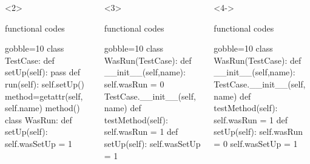 \documentclass[lualatex]{beamer}
\begin{document}
\begin{frame}[fragile,t]
\begin{columns}[t]
    \begin{onlyenv}<2>
      \begin{block}{functional codes}
        \begin{pythoncode*}{gobble=10}
          class TestCase:
            def setUp(self):
              pass
            def run(self):
              self.setUp()
              method=getattr(self, self.name)
              method()
          class WasRun:
            def setUp(self):
              self.wasSetUp = 1
        \end{pythoncode*}
      \end{block}
    \end{onlyenv}
    \begin{onlyenv}<3>
      \begin{block}{functional codes}
        \begin{pythoncode*}{gobble=10}
          class WasRun(TestCase):
            def __init__(self,name):
              self.wasRun = 0
              TestCase.__init__(self, name)
            def testMethod(self):
              self.wasRun = 1
            def setUp(self):
              self.wasSetUp = 1
        \end{pythoncode*}
      \end{block}
    \end{onlyenv}
    \begin{onlyenv}<4->
      \begin{block}{functional codes}
        \begin{pythoncode*}{gobble=10}
          class WasRun(TestCase):
            def __init__(self,name):
              TestCase.__init__(self, name)
            def testMethod(self):
              self.wasRun = 1
            def setUp(self):
              self.wasRun = 0
              self.wasSetUp = 1
        \end{pythoncode*}
      \end{block}
    \end{onlyenv}
  \end{columns}
\end{frame}
\end{document}
